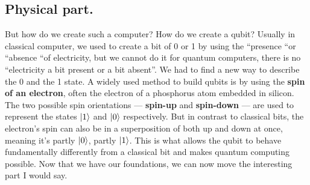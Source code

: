 \subsection{Physical part.}

But how do we create such a computer? How do we create a qubit? Usually in classical computer, we used to create a bit of 0 or 1 by using the “presence “or “absence “of electricity, but we cannot do it for quantum computers, there is no “electricity a bit present or a bit absent”.\nl
We had to find a new way to describe the 0 and the 1 state.\nl
A widely used method to build qubits is by using the \textbf{spin of an electron}, often the electron of a phosphorus atom embedded in silicon. The two possible spin orientations — \textbf{spin-up} and \textbf{spin-down} — are used to represent the states $\ket{1}$  and $\ket{0}$ respectively. But in contrast to classical bits, the electron’s spin can also be in a superposition of both up and down at once, meaning it’s partly $\ket{0}$, partly $\ket{1}$. This is what allows the qubit to behave fundamentally differently from a classical bit and makes quantum computing possible.\nl
Now that we have our foundations, we can now move the interesting part I would say.
